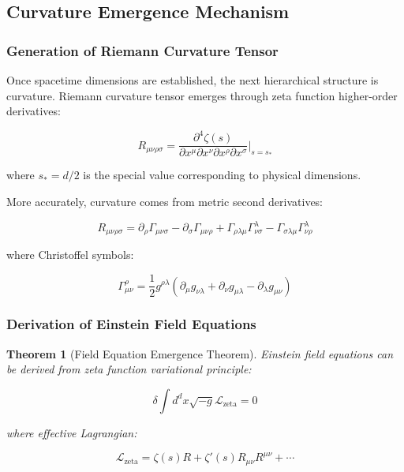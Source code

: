 \documentclass[12pt,a4paper]{article}
\newtheorem{theorem}{Theorem}[section]
\begin{document}
\subsection{Curvature Emergence Mechanism}

\subsubsection{Generation of Riemann Curvature Tensor}

Once spacetime dimensions are established, the next hierarchical structure is curvature. Riemann curvature tensor emerges through zeta function higher-order derivatives:

$$R_{\mu\nu\rho\sigma} = \frac{\partial^4 \zeta(s)}{\partial x^{\mu} \partial x^{\nu} \partial x^{\rho} \partial x^{\sigma}} \bigg|_{s = s_*}$$

where $s_* = d/2$ is the special value corresponding to physical dimensions.

More accurately, curvature comes from metric second derivatives:

$$R_{\mu\nu\rho\sigma} = \partial_{\rho} \Gamma_{\mu\nu\sigma} - \partial_{\sigma} \Gamma_{\mu\nu\rho} + \Gamma_{\rho\lambda\mu} \Gamma^{\lambda}_{\nu\sigma} - \Gamma_{\sigma\lambda\mu} \Gamma^{\lambda}_{\nu\rho}$$

where Christoffel symbols:

$$\Gamma_{\mu\nu}^{\rho} = \frac{1}{2} g^{\rho\lambda} (\partial_{\mu} g_{\nu\lambda} + \partial_{\nu} g_{\mu\lambda} - \partial_{\lambda} g_{\mu\nu})$$

\subsubsection{Derivation of Einstein Field Equations}

\begin{theorem}[Field Equation Emergence Theorem]
Einstein field equations can be derived from zeta function variational principle:

$$\delta \int d^d x \sqrt{-g} \mathcal{L}_{\text{zeta}} = 0$$

where effective Lagrangian:

$$\mathcal{L}_{\text{zeta}} = \zeta(s) R + \zeta'(s) R_{\mu\nu} R^{\mu\nu} + \cdots$$
\end{theorem}
\end{document}
